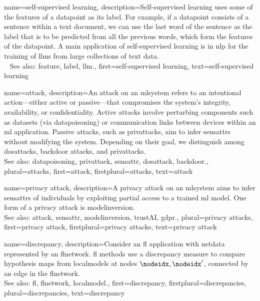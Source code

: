 {name={self-supervised learning},
 	description={Self-supervised learning uses some of 
  		the \glspl{feature} of a \gls{datapoint} as its \gls{label}. For 
		example, if a \gls{datapoint} consists of a sentence within a text document, 
		we can use the last word of the sentence as the \gls{label} that is 
		to be predicted from all the previous words, which form the \glspl{feature} 
		of the \gls{datapoint}. A main application of self-supervised learning 
		is in \gls{nlp} for the \gls{training} of \glspl{llm} from large collections 
		of text \gls{data}. 
		\\ 
      		See also: \gls{feature}, \gls{label}, \gls{llm}.}, 
   	first={self-supervised learning}, 
   	text={self-supervised learning}
}

{name={attack},  
	description={An attack on an \gls{mlsystem} refers to an intentional \gls{action}—either 
		active or passive—that compromises the system's integrity, availability, or confidentiality. 
		Active attacks involve perturbing components such as \glspl{dataset} (via \gls{datapoisoning}) 
		or communication links between \glspl{device} within an \gls{ml} application. Passive attacks, 
		such as \glspl{privattack}, aim to infer \glspl{sensattr} without modifying the system. 
		Depending on their goal, we distinguish among \glspl{dosattack}, \gls{backdoor} attacks, and \glspl{privattack}.
		\\
		See also: \gls{datapoisoning}, \gls{privattack}, \gls{sensattr}, \gls{dosattack}, \gls{backdoor}.},
	plural={attacks}, 
	first={attack},
	firstplural={attacks},
	text={attack}
}

{name={privacy attack},
	description={A privacy \gls{attack} on an \gls{mlsystem} aims to infer 
		\glspl{sensattr} of individuals by exploiting partial access to a trained \gls{ml} \gls{model}. 
		One form of a privacy \gls{attack} is \gls{modelinversion}.
		\\
		See also: \gls{attack}, \gls{sensattr}, \gls{modelinversion}, \gls{trustAI}, \gls{gdpr}.},
	plural={privacy attacks}, 
	first={privacy attack},
	firstplural={privacy attacks}, 
	text={privacy attack}
}

{name={discrepancy},
	description={Consider an \gls{fl} application with \gls{netdata} 
		represented by an \gls{flnetwork}. \gls{fl} methods use a discrepancy \gls{measure} 
		to compare \gls{hypothesis} \glspl{map} from \glspl{localmodel} at nodes $\nodeidx,\nodeidx'$, 
		\gls{connected} by an edge in the \gls{flnetwork}.
					\\ 
		See also: \gls{fl}, \gls{flnetwork}, \gls{localmodel}.},
	first={discrepancy},
	firstplural={discrepancies}, 
  	plural={discrepancies}, 
	text={discrepancy}
}


